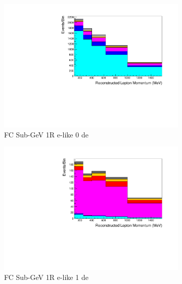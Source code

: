 \begin{figure}[ht]
    \begin{subfigure}[t]{0.49\textwidth}
    \includegraphics[width=\textwidth, trim= 0 0 0 30, clip]{Figures/Selections/AtmSpectra_ByMode/SubGeV-elike-0dcy_X.pdf}
    \caption{FC Sub-GeV 1R e-like 0 de}
    \end{subfigure}%
    \begin{subfigure}[t]{0.49\textwidth}
    \includegraphics[width=\textwidth, trim= 0 0 0 30, clip]{Figures/Selections/AtmSpectra_ByMode/SubGeV-elike-1dcy_X.pdf}
    \caption{FC Sub-GeV 1R e-like 1 de}
    \end{subfigure}
    \begin{subfigure}[t]{0.49\textwidth}

\end{subfigure}
\end{figure}
